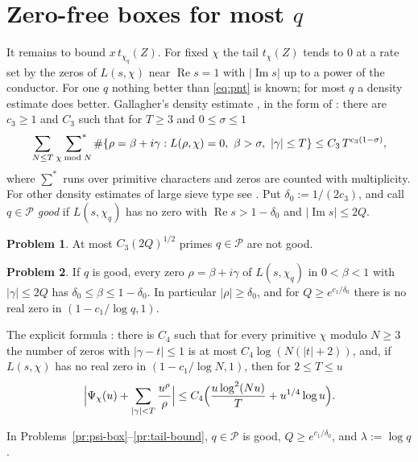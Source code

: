 \documentclass[reqno]{amsart}
\theoremstyle{definition}
\newtheorem{problem}{Problem}[section]
\theoremstyle{plain}
\renewcommand{\Re}{\operatorname{Re}}
\renewcommand{\Im}{\operatorname{Im}}
\newcommand{\Pc}{\mathcal{P}}
\begin{document}
\section{Zero-free boxes for most \texorpdfstring{$q$}{q}}\label{sec:boxes}

It remains to bound $x\, t_{\chi_q}(Z)$.  For fixed $\chi$ the tail $t_\chi(Z)$ tends to $0$ at a rate set by the zeros of $L(s, \chi)$ near $\Re s = 1$ with $\lvert \Im s \rvert$ up to a power of the conductor.  For one $q$ nothing better than \eqref{eq:pnt} is known; for most $q$ a density estimate does better.  Gallagher's density estimate \cite{Gal}, in the form of \cite[(1.3)]{TZ2}: there are $c_3 \ge 1$ and $C_3$ such that for $T \ge 3$ and $0 \le \sigma \le 1$
\[
  \sum_{N \le T} \ \sideset{}{^*}\sum_{\chi \bmod N} \#\{\rho = \beta + i\gamma : L(\rho, \chi) = 0,\ \beta > \sigma,\ \lvert \gamma \rvert \le T\} \le C_3\, T^{c_3(1 - \sigma)} ,
\]
where $\sum^*$ runs over primitive characters and zeros are counted with multiplicity.  For other density estimates of large sieve type see \cite[Ch.~12]{Mon}.  Put $\delta_0 := 1/(2c_3)$, and call $q \in \Pc$ \emph{good} if $L(s, \chi_q)$ has no zero with $\Re s > 1 - \delta_0$ and $\lvert \Im s \rvert \le 2Q$.

\begin{problem}\label{pr:box-count}
At most $C_3 (2Q)^{1/2}$ primes $q \in \Pc$ are not good.
\end{problem}

\begin{problem}\label{pr:box-symm}
If $q$ is good, every zero $\rho = \beta + i\gamma$ of $L(s, \chi_q)$ in $0 < \beta < 1$ with $\lvert \gamma \rvert \le 2Q$ has $\delta_0 \le \beta \le 1 - \delta_0$.  In particular $\lvert \rho \rvert \ge \delta_0$, and for $Q \ge e^{c_1/\delta_0}$ there is no real zero in $(1 - c_1/\log q, 1)$.
\end{problem}

The explicit formula \cite[Chs.~16 and~19]{Dav}: there is $C_4$ such that for every primitive $\chi$ modulo $N \ge 3$ the number of zeros with $\lvert \gamma - t \rvert \le 1$ is at most $C_4 \log(N(\lvert t \rvert + 2))$, and, if $L(s, \chi)$ has no real zero in $(1 - c_1/\log N, 1)$, then for $2 \le T \le u$
\[
  \Bigl\lvert \Psi_\chi(u) + \sum_{\lvert \gamma \rvert < T} \frac{u^\rho}{\rho} \Bigr\rvert \le C_4 \Bigl( \frac{u \log^2(Nu)}{T} + u^{1/4} \log u \Bigr) .
\]

In Problems~\ref{pr:psi-box}--\ref{pr:tail-bound}, $q \in \Pc$ is good, $Q \ge e^{c_1/\delta_0}$, and $\lambda := \log q$.
\end{document}
